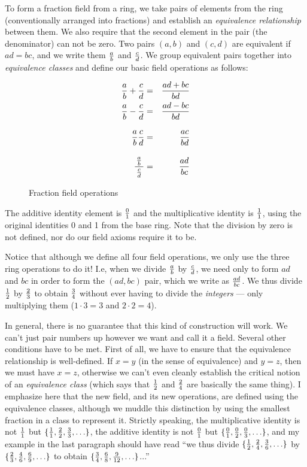 To form a fraction field from a ring, we take pairs of elements from
the ring (conventionally arranged into fractions) and establish an
{\it equivalence relationship} between them.  We also require that the
second element in the pair (the denominator) can not be zero.  Two
pairs $(a,b)$ and $(c,d)$ are equivalent if $ad=bc$, and we write them
$a\over b$ and $c\over d$.  We group equivalent pairs together into
{\it equivalence classes} and define our basic field operations as
follows:

\begin{figure}[h]
\label{fraction field operations}
\begin{mdframed}[backgroundcolor=cyan!20]
\begin{center}
\begin{eqnarray*}
{a\over b} + {c\over d} &=& {{ad+bc}\over{bd}} \cr
{a\over b} - {c\over d} &=& {{ad-bc}\over{bd}} \cr
{a\over b} {c\over d} &=& {{ac}\over{bd}} \vbox to20pt{}\cr
{\,{a\over b}\, \over {c \over d}} &=& {{ad}\over{bc}} \vbox to24pt{}\cr
\end{eqnarray*}
\end{center}
\end{mdframed}
\caption{Fraction field operations}
\end{figure}

The additive identity element is $0\over1$ and the multiplicative
identity is $1\over1$, using the original identities 0 and 1 from the
base ring.  Note that the division by zero is not defined, nor do
our field axioms require it to be.

Notice that although we define all four field operations, we only
use the three ring operations to do it!  I.e, when we divide
$a\over b$ by $c\over d$, we need only to form $ad$ and $bc$
in order to form the $(ad,bc)$ pair, which we write as ${ad}\over{bc}$.
We thus divide $1\over2$ by $2\over3$ to obtain $3\over4$
without ever having to divide the {\it integers} ---
only multiplying them ($1\cdot3=3$ and $2\cdot2=4$).

In general, there is no guarantee that this kind of construction will
work.  We can't just pair numbers up however we want and call it a
field.  Several other conditions have to be met.  First of all, we
have to ensure that the equivalence relationship is well-defined.  If
$x=y$ (in the sense of equivalence) and $y=z$, then we must have
$x=z$, otherwise we can't even cleanly establish the critical notion
of an {\it equivalence class} (which says that $1\over2$ and $2\over4$
are basically the same thing).  I emphasize here that the new field,
and its new operations, are defined using the equivalence classes,
although we muddle this distinction by using the smallest fraction in
a class to represent it.  Strictly speaking, the multiplicative
identity is not ${1\over1}$ but
$\{{1\over1},{2\over2},{3\over3},\ldots\}$, the additive identity is
not ${0\over1}$ but $\{{0\over1},{0\over2},{0\over3},\ldots\}$, and my
example in the last paragraph should have read ``we thus divide
$\{{1\over2},{2\over4},{3\over6},\ldots\}$ by
$\{{2\over3},{4\over6},{6\over9},\ldots\}$ to obtain
$\{{3\over4},{6\over8},{9\over12},\ldots\}$...''

